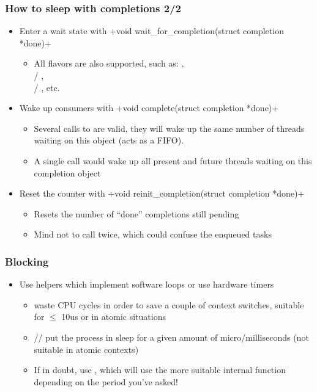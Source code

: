 \begin{frame}[fragile]
  \newcommand\kfuncbis[2]{\href{https://elixir.bootlin.com/linux/latest/ident/#1}{\codelink{#2()}}}
  \frametitle{How to sleep with completions 2/2}
  \begin{itemize}
  \item Enter a wait state with +void wait_for_completion(struct completion *done)+
    \begin{itemize}
    \item All  flavors are also supported, such as:
      , \\
       /
      \kfuncbis{wait_for_completion_interruptible_timeout}{_timeout}, \\
       /
      \kfuncbis{wait_for_completion_killable_timeout}{_timeout}, etc.
    \end {itemize}
  \item Wake up consumers with
    +void complete(struct completion *done)+
    \begin{itemize}
    \item Several calls to  are valid, they will wake up
      the same number of threads waiting on this object (acts as a FIFO).
    \item A single  call would wake up all present and
      future threads waiting on this completion object
    \end {itemize}
  \item Reset the counter with
    +void reinit_completion(struct completion *done)+
    \begin{itemize}
    \item Resets the number of ``done'' completions still pending
    \item Mind not to call  twice, which could
      confuse the enqueued tasks
    \end{itemize}
  \end{itemize}
\end{frame}

\begin{frame}[fragile]
  \frametitle{Blocking}
  \begin{itemize}
  \item Use helpers which implement software loops or use hardware timers
    \begin{itemize}
    \item {} waste CPU cycles in order
      to save a couple of context switches, suitable for $\le$ 10us or in atomic
      situations
    \item {}// put the
      process in sleep for a given amount of micro/milliseconds (not suitable in
      atomic contexts)
    \item If in doubt, use , which will use the more suitable
      internal function depending on the period you've asked!
    \end{itemize}
  \end{itemize}
\end{frame}

